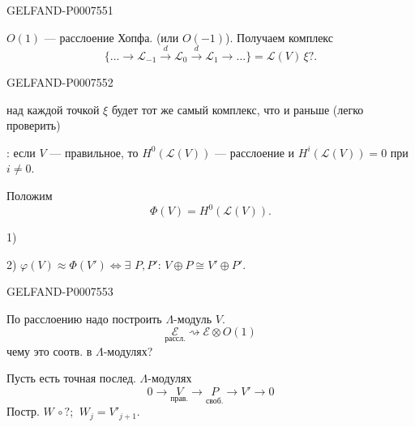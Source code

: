 \begin{GelfandAdjacentEvidence}{GELFAND-P000755}{1}

\(O(1)\) --- расслоение Хопфа. (или \(O(-1)\)).
Получаем комплекс
\begin{equation*}
\{\ldots\longrightarrow\mathcal L_{-1}
\xrightarrow{d}\mathcal L_0\xrightarrow{d}\mathcal L_1
\longrightarrow\ldots\}
=\mathcal L(V)\,\xi?.
\tag{11}
\end{equation*}
\end{GelfandAdjacentEvidence}
\begin{GelfandAdjacentEvidence}{GELFAND-P000755}{2}


над каждой точкой \(\xi\) будет тот же самый комплекс, что и раньше (легко проверить)

: если \(V\) --- правильное, то
\(H^0(\mathcal L(V))\) --- расслоение и
\(H^i(\mathcal L(V))=0\) при \(i\ne0\).

Положим
\begin{equation*}
\Phi(V)=H^0(\mathcal L(V)).
\tag{12}
\end{equation*}

1) 

2) \(\varphi(V)\approx\Phi(V')\Leftrightarrow\exists\)
 \(P,P'\):
\(V\oplus P\cong V'\oplus P'\).
\end{GelfandAdjacentEvidence}
\begin{GelfandAdjacentEvidence}{GELFAND-P000755}{3}



По расслоению надо построить \(\Lambda\)-модуль \(V\).
\begin{equation*}
\underset{\text{рассл.}}{\mathcal E}
\rightsquigarrow\mathcal E\otimes O(1)
\tag{13}
\end{equation*}
чему это соотв. в \(\Lambda\)-модулях?

Пусть есть точная послед. \(\Lambda\)-модулях
\begin{equation*}
0\longrightarrow\underset{\text{прав.}}{V}
\longrightarrow\underset{\text{своб.}}{P}
\longrightarrow V'\longrightarrow0
\tag{14}
\end{equation*}
Постр. \(W\,\circ?\); \(\ W_j=V'_{j+1}\).
\end{GelfandAdjacentEvidence}
